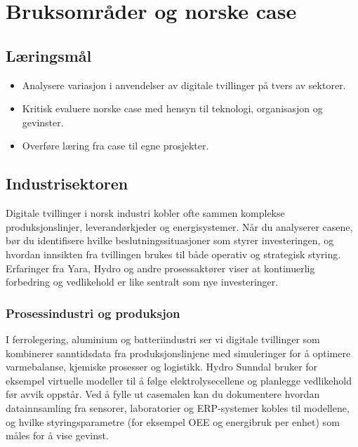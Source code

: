 \chapter{Bruksområder og norske case}

\section{Læringsmål}
\begin{itemize}
    \item Analysere variasjon i anvendelser av digitale tvillinger på tvers av sektorer.
    \item Kritisk evaluere norske case med hensyn til teknologi, organisasjon og gevinster.
    \item Overføre læring fra case til egne prosjekter.
\end{itemize}

\section{Industrisektoren}
Digitale tvillinger i norsk industri kobler ofte sammen komplekse produksjonslinjer, leverandørkjeder og energisystemer. Når du analyserer casene, bør du identifisere hvilke beslutningssituasjoner som styrer investeringen, og hvordan innsikten fra tvillingen brukes til både operativ og strategisk styring. Erfaringer fra Yara, Hydro og andre prosessaktører viser at kontinuerlig forbedring og vedlikehold er like sentralt som nye investeringer.

\subsection*{Prosessindustri og produksjon}
I ferrolegering, aluminium og batteriindustri ser vi digitale tvillinger som kombinerer sanntidsdata fra produksjonslinjene med simuleringer for å optimere varmebalanse, kjemiske prosesser og logistikk. Hydro Sunndal bruker for eksempel virtuelle modeller til å følge elektrolysecellene og planlegge vedlikehold før avvik oppstår. Ved å fylle ut casemalen kan du dokumentere hvordan datainnsamling fra sensorer, laboratorier og ERP-systemer kobles til modellene, og hvilke styringsparametre (for eksempel OEE og energibruk per enhet) som måles for å vise gevinst.

